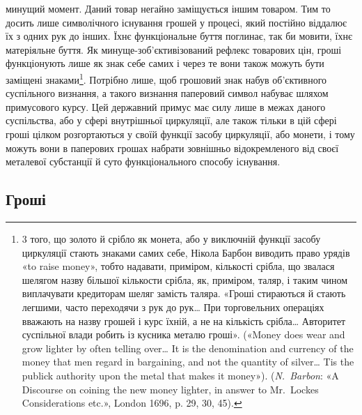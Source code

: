 \parcont{}  %
минущий момент. Даний товар негайно заміщується іншим товаром.
Тим то досить лише символічного існування грошей у процесі,
який постійно віддалює їх з одних рук до інших. Їхнє функціональне
буття поглинає, так би мовити, їхнє матеріяльне буття.
Як минуще-зоб’єктивізований рефлекс товарових цін, гроші
функціонують лише як знак себе самих і через те вони також
можуть бути заміщені знаками\footnote{
3 того, що золото й срібло як монета, або у виключній функції
засобу циркуляції стають знаками самих себе, Нікола Барбон виводить
право урядів «to raise money», тобто надавати, приміром, кількості срібла,
що звалася шелягом назву більшої кількости срібла, як, приміром, таляр,
і таким чином виплачувати кредиторам шеляг замість таляра. «Гроші
стираються й стають легшими, часто переходячи з рук до рук\dots{} При торговельних
операціях вважають на назву грошей і курс їхній, а не на кількість
срібла\dots{} Авторитет суспільної влади робить із кусника металю
гроші». («Money does wear and grow lighter by often telling over\dots{} It is
the denomination and currency of the money that men regard in bargaining,
and not the quantity of silver\dots{} Tis the publick authority upon the metal
that makes it money»). (\emph{N.~Barbon}: «A Discourse on coining the new
money lighter, in answer to Mr.~Lockes Considerations etc.», London 1696,
p. 29, 30, 45).
}. Потрібно лише, щоб грошовий
знак набув об’єктивного суспільного визнання, а такого визнання
паперовий символ набуває шляхом примусового курсу. Цей
державний примус має силу лише в межах даного суспільства,
або у сфері внутрішньої циркуляції, але також тільки в цій
сфері гроші цілком розгортаються у своїй функції засобу циркуляції,
або монети, і тому можуть вони в паперових грошах набрати
зовнішньо відокремленого від своєї металевої субстанції й суто
функціонального способу існування.

\subsection{Гроші}

